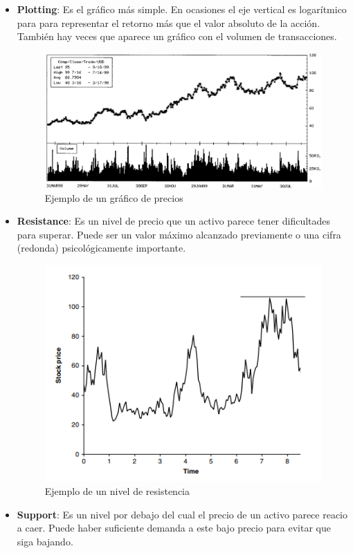 \begin{itemize}
    \item \textbf{Plotting}: Es el gráfico más simple. En ocasiones el eje vertical es logarítmico para para representar el retorno más que el valor absoluto de la acción. También hay veces que aparece un gráfico con el volumen de transacciones.
        \begin{figure}[H]
            \centering
            \includegraphics[width=0.65\linewidth]{Imagenes/Parte1/16_Prediccion/Plotting.png}
            \caption{Ejemplo de un gráfico de precios}
        \end{figure}
    \item \textbf{Resistance}: Es un nivel de precio que un activo parece tener dificultades para superar. Puede ser un valor máximo alcanzado previamente o una cifra (redonda) psicológicamente importante.
        \begin{figure}[H]
            \centering
            \includegraphics[width=0.65\linewidth]{Imagenes/Parte1/16_Prediccion/Resistance.png}
            \caption{Ejemplo de un nivel de resistencia}
        \end{figure}
    \item \textbf{Support}: Es un nivel por debajo del cual el precio de un activo parece reacio a caer. Puede haber suficiente demanda a este bajo precio para evitar que siga bajando.
        \begin{figure}[H]
            \centering

\end{figure}
\end{itemize}

